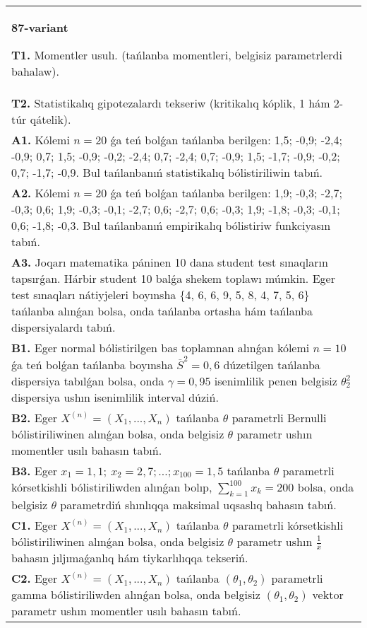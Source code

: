 \documentclass{article}
\begin{document}
\begin{tabular}{m{17cm}}
\textbf{87-variant}
\newline

\textbf{T1.} 
Momentler usulı. (tańlanba momentleri, belgisiz parametrlerdi bahalaw).
 \\
\textbf{T2.} 
Statistikalıq gipotezalardı tekseriw (kritikalıq kóplik, 1 hám 2-túr qátelik).
 \\
\textbf{A1.} 
Kólemi \(n = 20\) ǵa teń bolǵan tańlanba berilgen: 1,5; -0,9; -2,4; -0,9; 0,7; 1,5; -0,9; -0,2; -2,4; 0,7; -2,4; 0,7; -0,9; 1,5; -1,7; -0,9; -0,2; 0,7; -1,7; -0,9. Bul tańlanbanıń statistikalıq bólistiriliwin tabıń.
 \\
\textbf{A2.} 
Kólemi \(n = 20\) ǵa teń bolǵan tańlanba berilgen: 1,9; -0,3; -2,7; -0,3; 0,6; 1,9; -0,3; -0,1; -2,7; 0,6; -2,7; 0,6; -0,3; 1,9; -1,8; -0,3; -0,1; 0,6; -1,8; -0,3. Bul tańlanbanıń empirikalıq bólistiriw funkciyasın tabıń.
 \\
\textbf{A3.} 
Joqarı matematika páninen 10 dana student test sınaqların tapsırǵan. Hárbir student 10 balǵa shekem toplawı múmkin. Eger test sınaqları nátiyjeleri boyınsha \{4, 6, 6, 9, 5, 8, 4, 7, 5, 6\} tańlanba alınǵan bolsa, onda tańlanba ortasha hám tańlanba dispersiyalardı tabıń.
 \\
\textbf{B1.} 
Eger normal bólistirilgen bas toplamnan alınǵan kólemi \(n = 10\) ǵa teń bolǵan tańlanba boyınsha \({\overline{S}}^{2} = 0,6\) dúzetilgen tańlanba dispersiya tabılǵan bolsa, onda \(\gamma = 0,95\) isenimlilik penen belgisiz \(\theta_{2}^{2}\) dispersiya ushın isenimlilik interval dúziń.
 \\
\textbf{B2.} 
Eger \(X^{(n)} = \left( X_{1},...,X_{n} \right)\) tańlanba \(\theta\) parametrli Bernulli bólistiriliwinen alınǵan bolsa, onda belgisiz \(\theta\) parametr ushın momentler usılı bahasın tabıń.
 \\
\textbf{B3.} 
Eger \(x_{1} = 1,1;\ x_{2} = 2,7;\ldots;x_{100} = 1,5\) tańlanba \(\theta\) parametrli kórsetkishli bólistiriliwden alınǵan bolıp, \(\sum_{k = 1}^{100}x_{k} = 200\) bolsa, onda belgisiz \(\theta\) parametrdiń shınlıqqa maksimal uqsaslıq bahasın tabıń.
 \\
\textbf{C1.} 
Eger \(X^{(n)} = \left( X_{1},...,X_{n} \right)\) tańlanba \(\theta\) parametrli kórsetkishli bólistiriliwinen alınǵan bolsa, onda belgisiz \(\theta\) parametr ushın \(\frac{1}{\overline{x}}\) bahasın jıljımaǵanlıq hám tiykarlılıqqa tekseriń.
 \\
\textbf{C2.} 
Eger \(X^{(n)} = \left( X_{1},...,X_{n} \right)\) tańlanba \(\left( \theta_{1},\theta_{2} \right)\) parametrli gamma bólistiriliwden alınǵan bolsa, onda belgisiz \(\left( \theta_{1},\theta_{2} \right)\) vektor parametr ushın momentler usılı bahasın tabıń.

\end{tabular}
\end{document}
